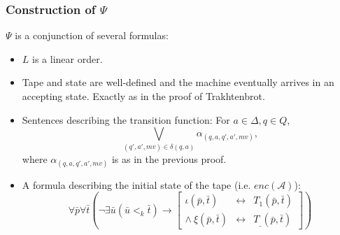 \documentclass{beamer}
\newcommand{\A}{\mathcal{A}}
\begin{document}
\begin{frame}
	\frametitle{Construction of $Ψ$}
	$Ψ$ is a conjunction of several formulas:
	\begin{itemize}
		\item $L$ is a linear order.
		\item Tape and state are well-defined and the machine eventually arrives in an accepting state. Exactly as in the proof of Trakhtenbrot.
		\item Sentences describing the transition function: For $a ∈ Δ, q ∈ Q$,
		\begin{equation*}
		\bigvee_{(q',a',mv) ∈ δ(q,a)} α_{(q,a,q',a',mv)},
		\end{equation*}
		where $α_{(q,a,q',a',mv)}$ is as in the previous proof.
		\item A formula describing the initial state of the tape (i.e. $enc(\A)$):
		\begin{equation*}
		∀\bar{p}∀\bar{t}\left(¬∃\bar{u} (\bar{u} <_k \bar{t}) → \left[
		\begin{array}{rcl}
		ι(\bar{p},\bar{t})&\leftrightarrow&T_1(\bar{p},\bar{t})\\
		∧\ ξ(\bar{p},\bar{t})&\leftrightarrow&T_{\_}(\bar{p},\bar{t})
		\end{array}		
		\right]\right)
		\end{equation*}
	\end{itemize}
\end{frame}
\end{document}
